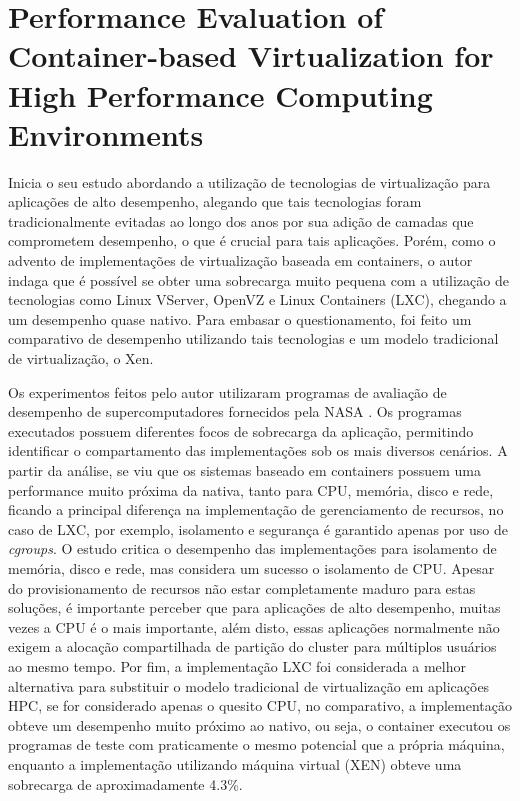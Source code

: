 \documentclass[twoside,english,brazilian]{UNISINOSartigo}
\begin{document}
\section{Performance Evaluation of Container-based Virtualization for High Performance Computing Environments}
\label{trabdocker3}
\cite{Xavier2013} Inicia o seu estudo abordando a utilização de tecnologias de virtualização para aplicações de alto desempenho, alegando que tais tecnologias foram tradicionalmente evitadas ao longo dos anos por sua adição de camadas que comprometem desempenho, o que é crucial para tais aplicações. Porém, como o advento de implementações de virtualização baseada em containers, o autor indaga que é possível se obter uma sobrecarga muito pequena com a utilização de tecnologias como Linux VServer, OpenVZ e Linux Containers (LXC), chegando a um desempenho quase nativo. Para embasar o questionamento, foi feito um comparativo de desempenho utilizando tais tecnologias e um modelo tradicional de virtualização, o Xen. 

Os experimentos feitos pelo autor utilizaram programas de avaliação de desempenho de supercomputadores fornecidos pela NASA \cite{NASA2016}. Os programas executados possuem diferentes focos de sobrecarga da aplicação, permitindo identificar o compartamento das implementações sob os mais diversos cenários. A partir da análise, se viu que os sistemas baseado em containers possuem uma performance muito próxima da nativa, tanto para CPU, memória, disco e rede, ficando a principal diferença na implementação de gerenciamento de recursos, no caso de  LXC, por exemplo, isolamento e segurança é garantido apenas por uso de \textit{cgroups}. O estudo critica o desempenho das implementações para isolamento de memória, disco e rede, mas considera um sucesso o isolamento de CPU. Apesar do provisionamento de recursos não estar completamente maduro para estas soluções, é importante perceber que para aplicações de alto desempenho, muitas vezes a CPU é o mais importante, além disto, essas aplicações normalmente não exigem a alocação compartilhada de partição do cluster para múltiplos usuários ao mesmo tempo. Por fim, a implementação LXC foi considerada a melhor alternativa para substituir o modelo tradicional de virtualização em aplicações HPC, se for considerado apenas o quesito CPU, no comparativo, a implementação obteve um desempenho muito próximo ao nativo, ou seja, o container executou os programas de teste com praticamente o mesmo potencial que a própria máquina, enquanto a implementação utilizando máquina virtual (XEN) obteve uma sobrecarga de aproximadamente 4.3\%.
\end{document}
